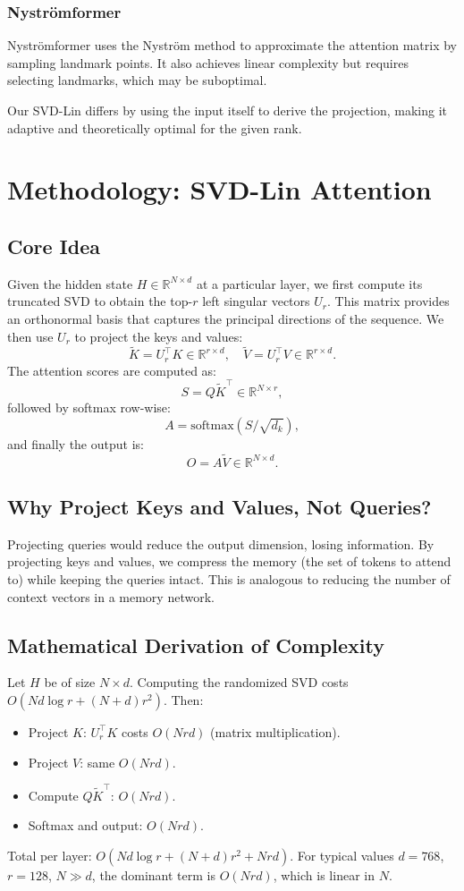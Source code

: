 \documentclass[twocolumn]{article}
\begin{document}
\subsubsection{Nyströmformer}
Nyströmformer \cite{xiong2021nystromformer} uses the Nyström method to approximate the attention matrix by sampling landmark points. It also achieves linear complexity but requires selecting landmarks, which may be suboptimal.

Our SVD-Lin differs by using the input itself to derive the projection, making it adaptive and theoretically optimal for the given rank.

\section{Methodology: SVD-Lin Attention}
\subsection{Core Idea}
Given the hidden state $H \in \mathbb{R}^{N \times d}$ at a particular layer, we first compute its truncated SVD to obtain the top-$r$ left singular vectors $U_r$. This matrix provides an orthonormal basis that captures the principal directions of the sequence. We then use $U_r$ to project the keys and values:
\[
\tilde{K} = U_r^\top K \in \mathbb{R}^{r \times d}, \quad
\tilde{V} = U_r^\top V \in \mathbb{R}^{r \times d}.
\]
The attention scores are computed as:
\[
S = Q \tilde{K}^\top \in \mathbb{R}^{N \times r},
\]
followed by softmax row-wise:
\[
A = \text{softmax}(S / \sqrt{d_k}),
\]
and finally the output is:
\[
O = A \tilde{V} \in \mathbb{R}^{N \times d}.
\]

\subsection{Why Project Keys and Values, Not Queries?}
Projecting queries would reduce the output dimension, losing information. By projecting keys and values, we compress the memory (the set of tokens to attend to) while keeping the queries intact. This is analogous to reducing the number of context vectors in a memory network.

\subsection{Mathematical Derivation of Complexity}
Let $H$ be of size $N \times d$. Computing the randomized SVD costs $O(N d \log r + (N+d) r^2)$. Then:
\begin{itemize}
    \item Project $K$: $U_r^\top K$ costs $O(N r d)$ (matrix multiplication).
    \item Project $V$: same $O(N r d)$.
    \item Compute $Q \tilde{K}^\top$: $O(N r d)$.
    \item Softmax and output: $O(N r d)$.
\end{itemize}
Total per layer: $O(N d \log r + (N+d) r^2 + N r d)$. For typical values $d=768$, $r=128$, $N \gg d$, the dominant term is $O(N r d)$, which is linear in $N$.
\end{document}
